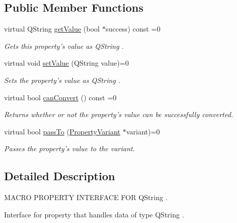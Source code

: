 \subsection*{Public Member Functions}
\begin{DoxyCompactItemize}
\item 
virtual Q\-String \hyperlink{class_i_string_property_a0dbe79993973e018510325120762504f}{get\-Value} (bool $\ast$success) const =0
\begin{DoxyCompactList}\small\item\em Gets this property's value as Q\-String . \end{DoxyCompactList}\item 
virtual void \hyperlink{class_i_string_property_a300b7403e9ce2929dabb5bb62d11142d}{set\-Value} (Q\-String value)=0
\begin{DoxyCompactList}\small\item\em Sets the property's value as Q\-String . \end{DoxyCompactList}\item 
virtual bool \hyperlink{class_i_string_property_a2fcab392710db1ae140e394c1db6739e}{can\-Convert} () const =0
\begin{DoxyCompactList}\small\item\em Returns whether or not the property's value can be successfully converted. \end{DoxyCompactList}\item 
virtual bool \hyperlink{class_i_string_property_a52c49ca31b5250fcc7914a453443b4e7}{pass\-To} (\hyperlink{class_property_variant}{Property\-Variant} $\ast$variant)=0
\begin{DoxyCompactList}\small\item\em Passes the property's value to the variant. \end{DoxyCompactList}\end{DoxyCompactItemize}


\subsection{Detailed Description}
M\-A\-C\-R\-O P\-R\-O\-P\-E\-R\-T\-Y I\-N\-T\-E\-R\-F\-A\-C\-E F\-O\-R Q\-String . 

Interface for property that handles data of type Q\-String . 

